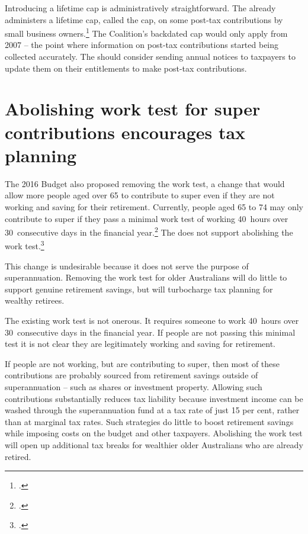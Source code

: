 \documentclass[continuous]{grattan}\usepackage[]{graphicx}\usepackage[]{color}
\begin{document}
Introducing a lifetime cap is administratively straightforward. 
The \ATO{} already administers a lifetime cap, called the \CGT{} cap, on some post-tax contributions by small business owners.\footcite{ATO-2016-CGT-cap-amount} %
The Coalition's backdated cap would only apply from 2007 -- the point where information on post-tax contributions started being collected accurately. 
The \ATO{} should consider sending annual notices to taxpayers to update them on their entitlements to make post-tax contributions.

\section{Abolishing work test for super contributions encourages tax planning}\label{sec:abolishing-work-test-encourages-tax-planning}
The 2016 Budget also proposed removing the work test, a change that would allow more people aged over 65 to contribute to super even if they are not working and saving for their retirement. 
Currently, people aged 65 to 74 may only contribute to super if they pass a minimal work test of working 40~hours over 30~consecutive days in the financial year.\footcite{ATO-2016-Age-super-contr-caps} %
The \ALP{} does not support abolishing the work test.\footcite{ALP-2016-Making-super-fairer}

This change is undesirable because it does not serve the purpose of superannuation. 
Removing the work test for older Australians will do little to support genuine retirement savings, but will turbocharge tax planning for wealthy retirees. 

The existing work test is not onerous.
It requires someone to work 40~hours over 30~consecutive days in the financial year. 
If people are not passing this minimal test it is not clear they are legitimately working and saving for retirement.

If people are not working, but are contributing to super, then most of these contributions are probably sourced from retirement savings outside of superannuation -- such as shares or investment property. 
Allowing such contributions substantially reduces tax liability because investment income can be washed through the superannuation fund at a tax rate of just 15 per cent, rather than at marginal tax rates. 
Such strategies do little to boost retirement savings while imposing costs on the budget and other taxpayers. 
Abolishing the work test will open up additional tax breaks for wealthier older Australians who are already retired.
\end{document}
